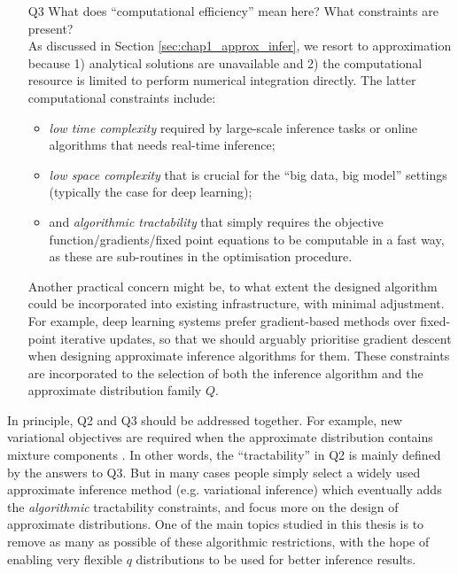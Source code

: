 \begin{itemize}
	\item[Q3] What does ``computational efficiency'' mean here? What constraints are present? \\
	As discussed in Section \ref{sec:chap1_approx_infer}, we resort to approximation because 1) analytical solutions are unavailable and 2) the computational resource is limited to perform numerical integration directly. The latter computational constraints include: 
	\begin{itemize}
	\item \emph{low time complexity} required by large-scale inference tasks or online algorithms that needs real-time inference; 
	\item \emph{low space complexity} that is crucial for the ``big data, big model'' settings (typically the case for deep learning);
	\item and \emph{algorithmic tractability} that simply requires the objective function/gradients/fixed point equations to be computable in a fast way, as these are sub-routines in the optimisation procedure.
	\end{itemize}
	 Another practical concern might be, to what extent the designed algorithm could be incorporated into existing infrastructure, with minimal adjustment. For example, deep learning systems prefer gradient-based methods over fixed-point iterative updates, so that we should arguably prioritise gradient descent when designing approximate inference algorithms for them. These constraints are incorporated to the selection of both the inference algorithm and the approximate distribution family $Q$.
	
\end{itemize}

In principle, Q2 and Q3 should be addressed together. For example, new variational objectives are required when the approximate distribution contains mixture components \citep{jaakkola:gmm1998, salimans:mcmcvi2015, tran:vgp2016, ranganath:hvm2016, maaloe:agdm2016}. In other words, the ``tractability'' in Q2 is mainly defined by the answers to Q3. But in many cases people simply select a widely used approximate inference method (e.g. variational inference) which eventually adds the \emph{algorithmic} tractability constraints, and focus more on the design of approximate distributions. One of the main topics studied in this thesis is to remove as many as possible of these algorithmic restrictions, with the hope of enabling very flexible $q$ distributions to be used for better inference results.


